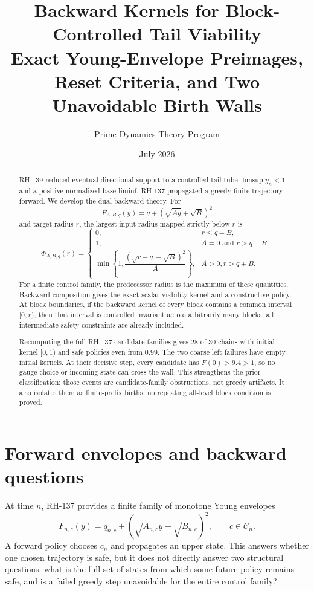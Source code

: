 \documentclass[12pt]{article}
\title{Backward Kernels for Block-Controlled Tail Viability\\\large Exact Young-Envelope Preimages, Reset Criteria, and Two Unavoidable Birth Walls}
\author{Prime Dynamics Theory Program}
\date{July 2026}
\begin{document}
\maketitle

\begin{abstract}
RH-139 reduced eventual directional support to a controlled tail tube
$\limsup y_n<1$ and a positive normalized-base liminf.  RH-137 propagated a
greedy finite trajectory forward.  We develop the dual backward theory.  For
\[
 F_{A,B,q}(y)=q+(\sqrt{Ay}+\sqrt B)^2
\]
and target radius $r$, the largest input radius mapped strictly below $r$ is
\[
 \Phi_{A,B,q}(r)=
 \begin{cases}
 0,&r\leq q+B,\\
 1,&A=0\text{ and }r>q+B,\\
 \min\!\left\{1,
 \dfrac{(\sqrt{r-q}-\sqrt B)^2}{A}\right\},&A>0, r>q+B.
 \end{cases}
\]
For a finite control family, the predecessor radius is the maximum of these
quantities.  Backward composition gives the exact scalar viability kernel
and a constructive policy.  At block boundaries, if the backward kernel of
every block contains a common interval $[0,r)$, then that interval is
controlled invariant across arbitrarily many blocks; all intermediate
safety constraints are already included.

Recomputing the full RH-137 candidate families gives 28 of 30 chains with
initial kernel $[0,1)$ and safe policies even from $0.99$.  The two coarse
left failures have empty initial kernels.  At their decisive step, every
candidate has $F(0)>9.4>1$, so no gauge choice or incoming state can cross
the wall.  This strengthens the prior classification: those events are
candidate-family obstructions, not greedy artifacts.  It also isolates them
as finite-prefix births; no repeating all-level block condition is proved.
\end{abstract}

\section{Forward envelopes and backward questions}
At time $n$, RH-137 provides a finite family of monotone Young envelopes
\[
 F_{n,c}(y)=q_{n,c}+
 (\sqrt{A_{n,c}y}+\sqrt{B_{n,c}})^2,
 \qquad c\in\mathcal C_n.
\]
A forward policy chooses $c_n$ and propagates an upper state.  This answers
whether one chosen trajectory is safe, but it does not directly answer two
structural questions: what is the full set of states from which some future
policy remains safe, and is a failed greedy step unavoidable for the entire
control family?
\end{document}
